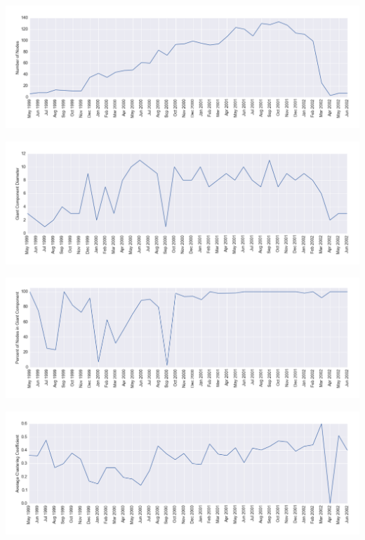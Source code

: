 \documentclass[12pt]{article}
\begin{document}
\includegraphics[width=1\textwidth]{Timeseries_Nodes}

\includegraphics[width=1\textwidth]{Timeseries_GiantDiameter}

\includegraphics[width=1\textwidth]{Timeseries_GiantSize}

\includegraphics[width=1\textwidth]{Timeseries_ClusteringCoefficient}
\end{document}
